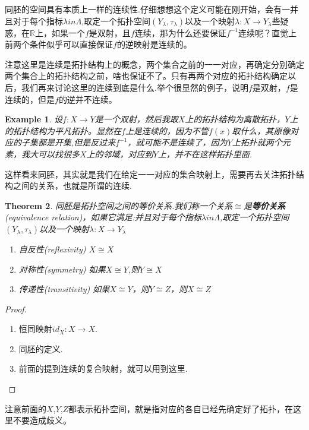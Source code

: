 \documentclass{article}
\newtheorem{theorem}{Theorem}[section]
\newtheorem{example}[theorem]{Example}
\newcommand*{\xfunc}[4]{{#2}\colon{#3}{#1}{#4}}
\newcommand*{\func}[3]{\xfunc{\to}{#1}{#2}{#3}}
\begin{document}
同胚的空间具有本质上一样的连续性.仔细想想这个定义可能在刚开始，会有一并且对于每个指标$\lambda in \Lambda$,取定一个拓扑空间$(Y_\lambda,\tau_\lambda)$以及一个映射$\func{\lambda}{X}{Y_\lambda}$些疑惑，在$\mathbb{R}$上，如果一个$f$是双射，且$f$连续，那为什么还要保证$f^{-1}$连续呢？直觉上前两个条件似乎可以直接保证$f$的逆映射是连续的。

注意这里是连续是拓扑结构上的概念，两个集合之前的一一对应，再确定分别确定两个集合上的拓扑结构之前，啥也保证不了。只有再两个对应的拓扑结构确定以后，我们再来讨论这里的连续到底是什么.举个很显然的例子，说明$f$是双射，$f$是连续的，但是$f$的逆并不连续。

\begin{example}
设$\func{f}{X}{Y}$是一个双射，然后我取$X$上的拓扑结构为离散拓扑，$Y$上的拓扑结构为平凡拓扑。显然在$f$上是连续的，因为不管$f(x)$取什么，其原像对应的子集都是开集,但是反过来$f^{-1}$，就可能不是连续了，因为$Y$上拓扑就两个元素，我大可以找很多$X$上的邻域，对应到$Y$上，并不在这样拓扑里面.
\end{example}

这样看来同胚，其实就是我们在给定一一对应的集合映射上，需要再去关注拓扑结构之间的关系，也就是所谓的连续.

\begin{theorem}
同胚是拓扑空间之间的等价关系.我们称一个关系$\cong$是\textbf{等价关系}(equivalence relation)，如果它满足:并且对于每个指标$\lambda in \Lambda$,取定一个拓扑空间$(Y_\lambda,\tau_\lambda)$以及一个映射$\func{\lambda}{X}{Y_\lambda}$
\begin{enumerate}
	\item 自反性(reflexivity) $X \cong X$
	\item 对称性(symmetry) 如果$X \cong Y$,则$Y \cong X$ 
	\item 传递性(transitivity) 如果$X \cong Y$，则$Y \cong Z$，则$X \cong Z$
\end{enumerate}
\end{theorem}

\begin{proof}
\begin{enumerate}
	\item 恒同映射$\func{id_X}{X}{X}$.
	\item 同胚的定义.
	\item 前面的提到连续的复合映射，就可以用到这里.
\end{enumerate}
\end{proof}

注意前面的$X$,$Y$,$Z$都表示拓扑空间，就是指对应的各自已经先确定好了拓扑，在这里不要造成歧义。
\end{document}
